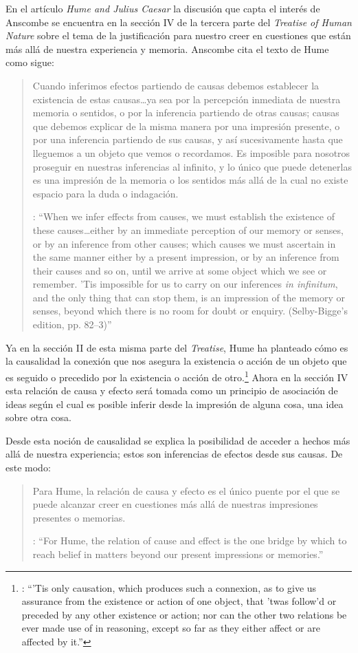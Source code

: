 En el artículo \emph{Hume and Julius Caesar} la discusión que capta el interés de Anscombe se encuentra en la sección IV de la tercera parte del \emph{Treatise of Human Nature} sobre el tema de la justificación para nuestro creer en cuestiones que están más allá de nuestra experiencia y memoria. Anscombe cita el texto de Hume como sigue: \blockquote[{\cite[86]{anscombe1981parmenides:humeandjulius}}: \enquote{When we infer effects from causes, we must establish the existence of these causes\ldots either by an immediate perception of our memory or senses, or by an inference from other causes; which causes we must ascertain in the same manner either by a present impression, or by an inference from their causes and so on, until we arrive at some object which we see or remember. 'Tis impossible for us to carry on our inferences \emph{in infinitum}, and the only thing that can stop them, is an impression of the memory or senses, beyond which there is no room for doubt or enquiry. (Selby-Bigge's edition, pp. 82--3)}]{Cuando inferimos efectos partiendo de causas debemos establecer la existencia de estas causas\ldots ya sea por la percepción inmediata de nuestra memoria o sentidos, o por la inferencia partiendo de otras causas; causas que debemos explicar de la misma manera por una impresión presente, o por una inferencia partiendo de sus causas, y así sucesivamente hasta que lleguemos a un objeto que vemos o recordamos. Es imposible para nosotros proseguir en nuestras inferencias al infinito, y lo único que puede detenerlas es una impresión de la memoria o los sentidos más allá de la cual no existe espacio para la duda o indagación.}

Ya en la sección II de esta misma parte del \emph{Treatise}, Hume ha planteado cómo es la causalidad la conexión que nos asegura la existencia o acción de un objeto que es seguido o precedido por la existencia o acción de otro.\footnote{\cite[Cf.~][53]{hume1740treatise}: \enquote{’Tis only causation, which produces such a connexion, as to give us assurance from the existence or action of one object, that ’twas follow’d or preceded by any other existence or action; nor can the other two relations be ever made use of in reasoning, except so far as they either affect or are affected by it.}} Ahora en la sección IV esta relación de causa y efecto será tomada como un principio de asociación de ideas según el cual es posible inferir desde la impresión de alguna cosa, una idea sobre otra cosa.

Desde esta noción de causalidad se explica la posibilidad de acceder a hechos más allá de nuestra experiencia; estos son inferencias de efectos desde sus causas. De este modo: \blockquote[{\cite[87]{anscombe1981parmenides:humeandjulius}}: \enquote{For Hume, the relation of cause and effect is the one bridge by which to reach belief in matters beyond our present impressions or memories.}]{Para Hume, la relación de causa y efecto es el único puente por el que se puede alcanzar creer en cuestiones más allá de nuestras impresiones presentes o memorias.}

